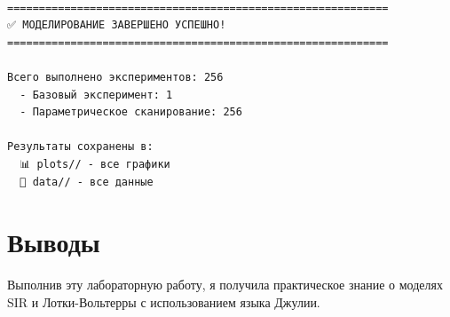 \documentclass[
  12pt,
  a4paper,
  DIV=11,
  numbers=noendperiod]{scrreprt}
\begin{document}
\begin{verbatim}

============================================================
✅ МОДЕЛИРОВАНИЕ ЗАВЕРШЕНО УСПЕШНО!
============================================================

Всего выполнено экспериментов: 256
  - Базовый эксперимент: 1
  - Параметрическое сканирование: 256

Результаты сохранены в:
  📊 plots// - все графики
  📁 data// - все данные
\end{verbatim}

\chapter{Выводы}\label{ux432ux44bux432ux43eux434ux44b}

Выполнив эту лабораторную работу, я получила практическое знание о
моделях SIR и Лотки-Вольтерры с использованием языка Джулии.


\printbibliography
\end{document}
